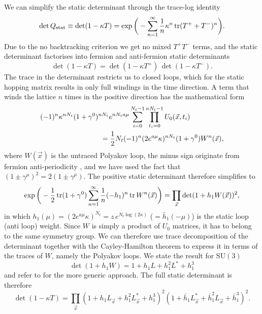 We can simplify the static determinant through the trace-log identity
%
\begin{equation}
  \det Q_{\text{stat}} \equiv \det (1 - \kappa T) = \exp \bigg(- \sum_{n=1}^{\infty}
    \frac{1}{n} \kappa^n \operatorname{tr} (T^+ + T^-)^n \bigg).
\end{equation}
%
Due to the no backtracking criterion we get no mixed $T^+ T^-$ terms, and the
static determinant factorises into fermion and anti-fermion static determinants
%
\begin{equation}
  \det (1 - \kappa T) = \det (1 - \kappa T^+)\, \det (1 - \kappa T^-) .
\end{equation}
%
The trace in the determinant restricts us to closed loops, which for the static
hopping matrix results in only full windings in the time direction. A term that
winds the lattice $n$ times in the positive direction has the mathematical form
%
\begin{align}
  &(-1)^n \kappa^{n N_t} (1+\gamma^0)^{n N_t} e^{n N_t a \mu}
    \sum_{i=0}^{N_t-1} \prod_{t_i=0}^{n N_t-1} U_0(\vec{x},t_i) \nonumber\\
  &\hskip3cm= \frac{1}{2} N_t (-1)^n (2 e^{a\mu} \kappa)^{n N_t} (1+\gamma^0) W^n(\vec{x}),
\end{align}
%
where $W(\vec{x})$ is the untraced Polyakov loop, the minus sign originate from
fermion anti-periodicity , and we have used the fact that $(1\pm\gamma^{\mu})^2
= 2 (1\pm\gamma^{\mu})$. The positive static determinant therefore simplifies to
%
\begin{equation}
  \exp\bigg(-\frac{1}{2} \operatorname{tr}(1+\gamma^0) \sum_{n=1}^{\infty} \frac{1}{n} (-h_1)^{n}
  \operatorname{tr} W^n (\vec{x}) \bigg) = \prod_{\vec{x}} \det(1 + h_1 W(\vec{x}))^2,
\end{equation}
%
in which $h_1(\mu) = (2e^{a\mu}\kappa)^{N_t} = z\, e^{N_t \log(2\kappa)}$
($=\bar{h}_1(-\mu)$) is the static loop (anti loop) weight. Since $W$ is simply
a product of $U_0$ matrices, it has to belong to the same symmetry group. We can
therefore use trace decomposition of the determinant together with the
Cayley-Hamilton theorem to express it in terms of the traces of $W$, namely the
Polyakov loops. We state the result for SU$(3)$
%
\begin{equation}
  \det(1 + h_1 W) = 1 + h_1 L + h_1^2 L^* + h_1^3
\end{equation}
%
and refer to  for the more generic
approach. The full static determinant is therefore
%
\begin{equation}
  \det(1 - \kappa T) = \prod_{\vec{x}} (1 + h_1 L_{\vec{x}} + h_1^2 L^*_{\vec{x}} + h_1^3)^2
    (1 + \bar{h}_1 L^*_{\vec{x}} +  \bar{h}_1^2 L_{\vec{x}} + \bar{h}_1^3)^2.
\end{equation}

